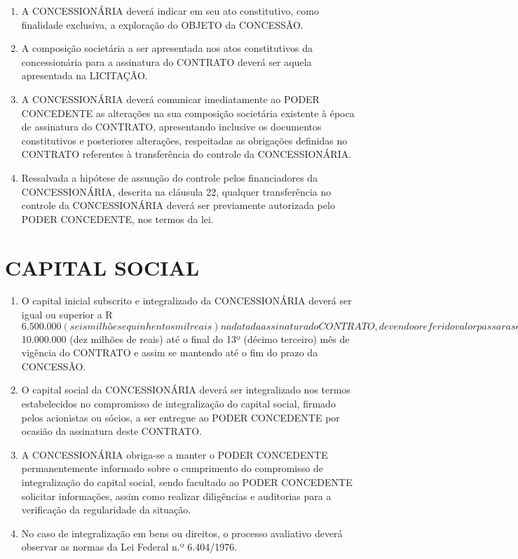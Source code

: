 \documentclass[a4paper,11pt]{report} %
\begin{document}
\begin{enumerate}
\item \label{itm:UHUT} A CONCESSIONÁRIA deverá indicar em seu ato constitutivo, como finalidade exclusiva, a exploração do OBJETO da CONCESSÃO.

\item \label{itm:M4JM} A composição societária a ser apresentada nos atos constitutivos da concessionária para a assinatura do CONTRATO deverá ser aquela apresentada na LICITAÇÃO.

\item \label{itm:X9WN} A CONCESSIONÁRIA deverá comunicar imediatamente ao PODER CONCEDENTE as alterações na sua composição societária existente à época de assinatura do CONTRATO, apresentando inclusive os documentos constitutivos e posteriores alterações, respeitadas as obrigações definidas no CONTRATO referentes à transferência do controle da CONCESSIONÁRIA.

\item \label{itm:M8MD} Ressalvada a hipótese de assunção do controle pelos financiadores da CONCESSIONÁRIA, descrita na cláusula 22, qualquer transferência no controle da CONCESSIONÁRIA deverá ser previamente autorizada pelo PODER CONCEDENTE, nos termos da lei. 
\end{enumerate}

\section{CAPITAL SOCIAL}
\label{sec:9BB2}

\begin{enumerate}
\item \label{itm:T56F} O capital inicial subscrito e integralizado da CONCESSIONÁRIA deverá ser igual ou superior a R$ 6.500.000 (seis milhões e quinhentos mil reais) na data da assinatura do CONTRATO, devendo o referido valor passar a ser de R$ 10.000.000 (dez milhões de reais) até o final do 13º (décimo terceiro) mês de vigência do CONTRATO e assim se mantendo até o fim do prazo da CONCESSÃO. 

\item \label{itm:F9PT} O capital social da CONCESSIONÁRIA deverá ser integralizado nos termos estabelecidos no compromisso de integralização do capital social, firmado pelos acionistas ou sócios, a ser entregue ao PODER CONCEDENTE por ocasião da assinatura deste CONTRATO. 

\item \label{itm:HYUD} A CONCESSIONÁRIA obriga-se a manter o PODER CONCEDENTE permanentemente informado sobre o cumprimento do compromisso de integralização do capital social, sendo facultado ao PODER CONCEDENTE solicitar informações, assim como realizar diligências e auditorias para a verificação da regularidade da situação. 

\item \label{itm:N5YT} No caso de integralização em bens ou direitos, o processo avaliativo deverá observar as normas da Lei Federal n.º 6.404/1976. 
\end{enumerate}
\end{document}
